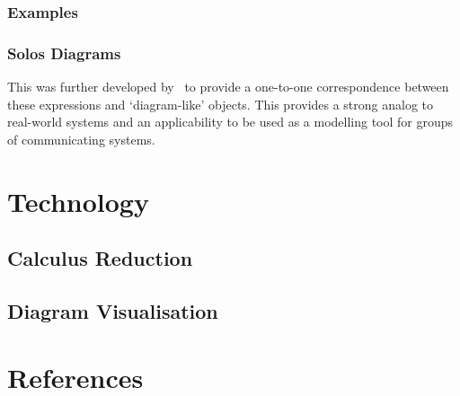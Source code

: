 \documentclass{article}
\begin{document}
        \subsubsection{Examples}


        \subsubsection{Solos Diagrams}
            This was further developed by~\cite{solo-diagrams} to provide a one-to-one correspondence between these  expressions and `diagram-like' objects. This provides a strong analog to real-world systems and an applicability to be used as a modelling tool for groups of communicating systems.




\section{Technology}

    \subsection{Calculus Reduction}


    \subsection{Diagram Visualisation}
        \cite{learning-styles}



\section{References}

    



\end{document}

